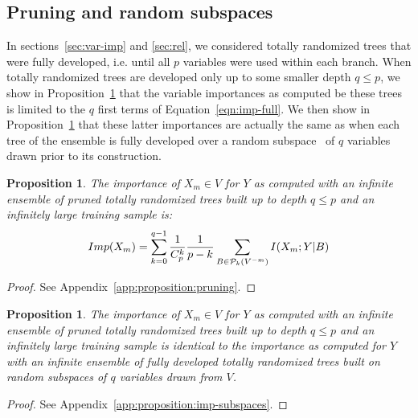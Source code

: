 \documentclass{article}
\newtheorem{proposition}[theorem]{Proposition}
\begin{document}

\subsection{Pruning and random subspaces}

In sections~\ref{sec:var-imp} and \ref{sec:rel}, we considered totally randomized trees that were
fully developed, i.e. until all $p$ variables were used within each branch. When
totally randomized trees are developed only up to some smaller depth $q \leq p$,
we show in Proposition~\ref{proposition:pruning} that the variable importances
as computed be these trees is limited to the $q$ first terms of
Equation~\ref{eqn:imp-full}. We then show in Proposition~\ref{proposition:imp-subspaces}
that these latter importances are actually the same as when each tree
of the ensemble is fully developed over a random subspace~\citep{ho1998random}
of $q$ variables drawn prior to its construction.

\begin{proposition}\label{proposition:pruning}
  The importance of $X_m \in V$ for $Y$ as computed with an
  infinite ensemble of pruned totally randomized trees built up to depth $q \leq p$ and an
infinitely large training sample is:
  \begin{equation}\label{eqn:imp-pruning}
  Imp(X_m)=\sum_{k=0}^{q-1} \frac{1}{C_p^k} \frac{1}{p-k} \sum_{B \in {\cal P}_k(V^{-m})} I(X_m;Y|B)
  \end{equation}
\end{proposition}

\begin{proof}
See Appendix~\ref{app:proposition:pruning}.
\end{proof}

\begin{proposition}\label{proposition:imp-subspaces}
  The importance of $X_m \in V$ for $Y$ as computed with an infinite ensemble   of
pruned totally randomized trees built up to depth $q \leq p$ and an infinitely
large training sample is identical to the importance as computed  for $Y$ with an
infinite ensemble of fully developed totally randomized trees built on random
subspaces of $q$ variables drawn from $V$.
\end{proposition}

\begin{proof}
See Appendix~\ref{app:proposition:imp-subspaces}.
\end{proof}
\end{document}
